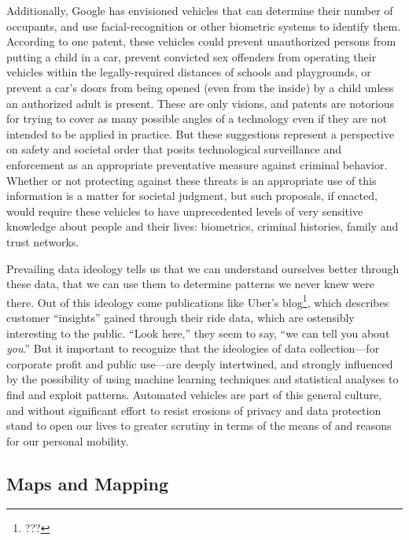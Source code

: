 Additionally, Google has envisioned vehicles that can determine their number of
occupants, and use facial-recognition or other biometric systems to
identify them. According to one patent,\cite{predictPatent} these vehicles could prevent
unauthorized persons from putting a child in a car, prevent convicted
sex offenders from operating their vehicles within the
legally-required distances of schools and playgrounds, or prevent a
car's doors from being opened (even from the inside) by a child unless
an authorized adult is present. These are only visions, and patents
are notorious for trying to cover as many possible angles of a
technology even if they are not intended to be applied in practice.
But these suggestions represent a perspective on safety and societal
order that posits technological surveillance and enforcement as an
appropriate preventative measure against criminal behavior. Whether or not protecting
against these threats is an appropriate use of this information is a
matter for societal judgment, but such proposals, if enacted, would
require these vehicles to have unprecedented levels of very sensitive
knowledge about people and their lives: biometrics, criminal
histories, family and trust networks. 

Prevailing data ideology tells us that we can understand ourselves better through
these data, that we can use them to determine patterns we never knew were
there. Out of this ideology come publications like Uber's blog\footnote{???}, which
describes customer ``insights'' gained through their ride data, which
are ostensibly interesting to the public. ``Look here,'' they seem to
say, ``we can tell you about \emph{you}.'' But it important to
recognize that the ideologies of data collection---for corporate
profit and public use---are deeply intertwined, and strongly
influenced by the possibility of using machine learning techniques and
statistical analyses to find and exploit patterns. Automated vehicles
are part of this general culture, and without significant effort to
resist erosions of privacy and data protection stand to open our lives
to greater scrutiny in terms of the means of and reasons for our
personal mobility.



\subsection{Maps and Mapping}

